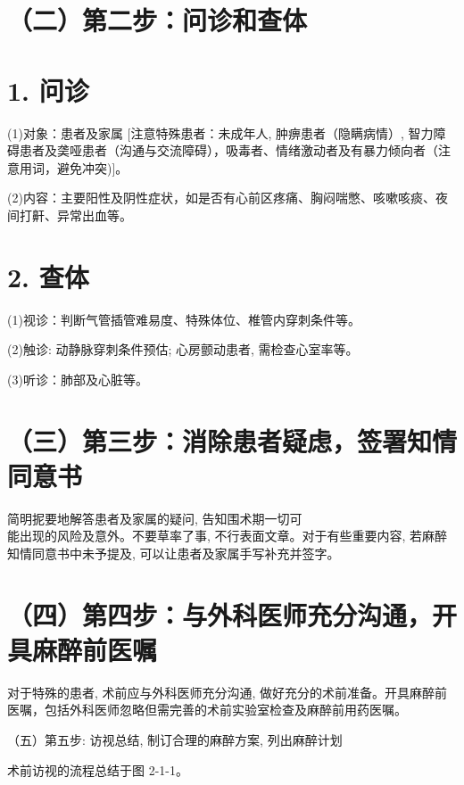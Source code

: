\documentclass[10pt]{article}
\begin{document}
\section*{（二）第二步：问诊和查体}
\section*{1. 问诊}
(1)对象：患者及家属 [注意特殊患者：未成年人, 肿痹患者（隐瞒病情）, 智力障碍患者及䶮哑患者（沟通与交流障碍），吸毒者、情绪激动者及有暴力倾向者（注意用词，避免冲突)]。

(2)内容：主要阳性及阴性症状，如是否有心前区疼痛、胸闷喘憋、咳嗽咳痰、夜间打鼾、异常出血等。

\section*{2. 查体}
(1)视诊：判断气管插管难易度、特殊体位、椎管内穿刺条件等。

(2)触诊: 动静脉穿刺条件预估; 心房颤动患者, 需检查心室率等。

(3)听诊：肺部及心脏等。

\section*{（三）第三步：消除患者疑虑，签署知情同意书}
简明抳要地解答患者及家属的疑问, 告知围术期一切可\\
能出现的风险及意外。不要草率了事, 不行表面文章。对于有些重要内容, 若麻醉知情同意书中未予提及, 可以让患者及家属手写补充并签字。

\section*{（四）第四步：与外科医师充分沟通，开具麻醉前医嘱}
对于特殊的患者, 术前应与外科医师充分沟通, 做好充分的术前准备。开具麻醉前医嘱，包括外科医师忽略但需完善的术前实验室检查及麻醉前用药医嘱。

（五）第五步: 访视总结, 制订合理的麻醉方案, 列出麻醉计划

术前访视的流程总结于图 2-1-1。
\end{document}
